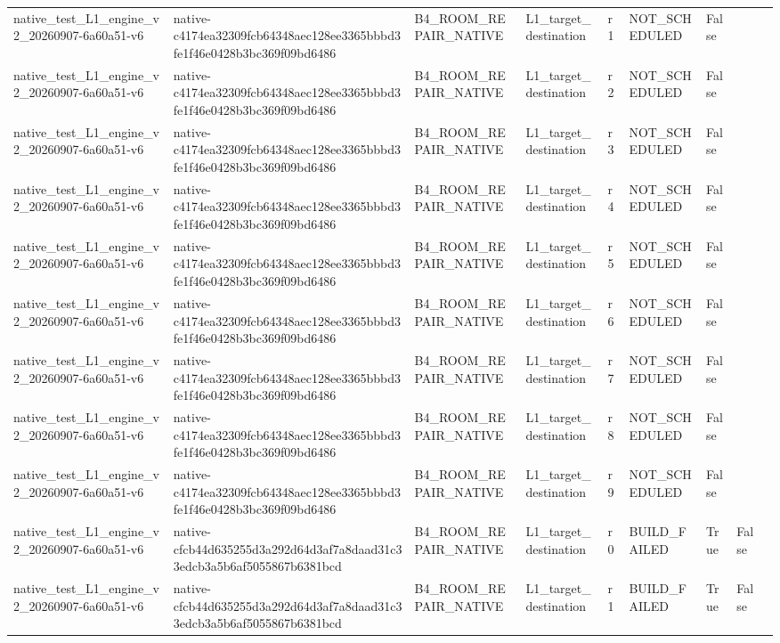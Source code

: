 \begin{tabular}{lllllllll}
native\_test\_L1\_engine\_v2\_20260907-6a60a51-v6 & native-c4174ea32309fcb64348aec128ee3365bbbd3fe1f46e0428b3bc369f09bd6486 & B4\_ROOM\_REPAIR\_NATIVE & L1\_target\_destination & r1 & NOT\_SCHEDULED & False &  &  \\
native\_test\_L1\_engine\_v2\_20260907-6a60a51-v6 & native-c4174ea32309fcb64348aec128ee3365bbbd3fe1f46e0428b3bc369f09bd6486 & B4\_ROOM\_REPAIR\_NATIVE & L1\_target\_destination & r2 & NOT\_SCHEDULED & False &  &  \\
native\_test\_L1\_engine\_v2\_20260907-6a60a51-v6 & native-c4174ea32309fcb64348aec128ee3365bbbd3fe1f46e0428b3bc369f09bd6486 & B4\_ROOM\_REPAIR\_NATIVE & L1\_target\_destination & r3 & NOT\_SCHEDULED & False &  &  \\
native\_test\_L1\_engine\_v2\_20260907-6a60a51-v6 & native-c4174ea32309fcb64348aec128ee3365bbbd3fe1f46e0428b3bc369f09bd6486 & B4\_ROOM\_REPAIR\_NATIVE & L1\_target\_destination & r4 & NOT\_SCHEDULED & False &  &  \\
native\_test\_L1\_engine\_v2\_20260907-6a60a51-v6 & native-c4174ea32309fcb64348aec128ee3365bbbd3fe1f46e0428b3bc369f09bd6486 & B4\_ROOM\_REPAIR\_NATIVE & L1\_target\_destination & r5 & NOT\_SCHEDULED & False &  &  \\
native\_test\_L1\_engine\_v2\_20260907-6a60a51-v6 & native-c4174ea32309fcb64348aec128ee3365bbbd3fe1f46e0428b3bc369f09bd6486 & B4\_ROOM\_REPAIR\_NATIVE & L1\_target\_destination & r6 & NOT\_SCHEDULED & False &  &  \\
native\_test\_L1\_engine\_v2\_20260907-6a60a51-v6 & native-c4174ea32309fcb64348aec128ee3365bbbd3fe1f46e0428b3bc369f09bd6486 & B4\_ROOM\_REPAIR\_NATIVE & L1\_target\_destination & r7 & NOT\_SCHEDULED & False &  &  \\
native\_test\_L1\_engine\_v2\_20260907-6a60a51-v6 & native-c4174ea32309fcb64348aec128ee3365bbbd3fe1f46e0428b3bc369f09bd6486 & B4\_ROOM\_REPAIR\_NATIVE & L1\_target\_destination & r8 & NOT\_SCHEDULED & False &  &  \\
native\_test\_L1\_engine\_v2\_20260907-6a60a51-v6 & native-c4174ea32309fcb64348aec128ee3365bbbd3fe1f46e0428b3bc369f09bd6486 & B4\_ROOM\_REPAIR\_NATIVE & L1\_target\_destination & r9 & NOT\_SCHEDULED & False &  &  \\
native\_test\_L1\_engine\_v2\_20260907-6a60a51-v6 & native-cfcb44d635255d3a292d64d3af7a8daad31c33edcb3a5b6af5055867b6381bcd & B4\_ROOM\_REPAIR\_NATIVE & L1\_target\_destination & r0 & BUILD\_FAILED & True & False &  \\
native\_test\_L1\_engine\_v2\_20260907-6a60a51-v6 & native-cfcb44d635255d3a292d64d3af7a8daad31c33edcb3a5b6af5055867b6381bcd & B4\_ROOM\_REPAIR\_NATIVE & L1\_target\_destination & r1 & BUILD\_FAILED & True & False &  \\

\end{tabular}
